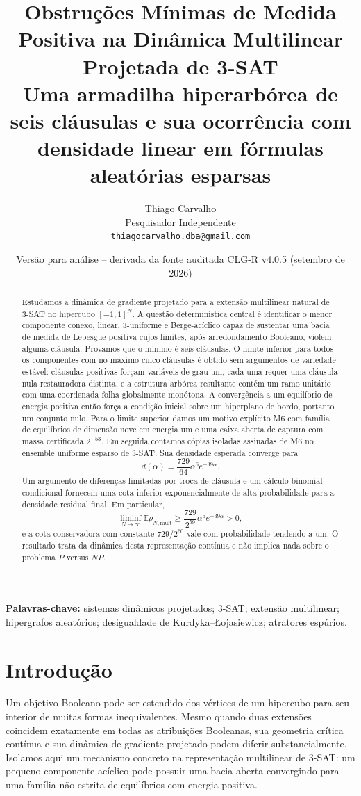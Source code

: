 \documentclass[11pt,a4paper]{article}
\title{Obstruções Mínimas de Medida Positiva na Dinâmica Multilinear Projetada de 3-SAT\\\large Uma armadilha hiperarbórea de seis cláusulas e sua ocorrência com densidade linear em fórmulas aleatórias esparsas}
\author{Thiago Carvalho\\Pesquisador Independente\\\texttt{thiagocarvalho.dba@gmail.com}}
\date{Versão para análise -- derivada da fonte auditada CLG-R v4.0.5 (setembro de 2026)}
\begin{document}
\maketitle
\begin{abstract}
Estudamos a dinâmica de gradiente projetado para a extensão multilinear natural de 3-SAT no hipercubo $[-1,1]^N$. A questão determinística central é identificar o menor componente conexo, linear, 3-uniforme e Berge-acíclico capaz de sustentar uma bacia de medida de Lebesgue positiva cujos limites, após arredondamento Booleano, violem alguma cláusula. Provamos que o mínimo é seis cláusulas. O limite inferior para todos os componentes com no máximo cinco cláusulas é obtido sem argumentos de variedade estável: cláusulas positivas forçam variáveis de grau um, cada uma requer uma cláusula nula restauradora distinta, e a estrutura arbórea resultante contém um ramo unitário com uma coordenada-folha globalmente monótona. A convergência a um equilíbrio de energia positiva então força a condição inicial sobre um hiperplano de bordo, portanto um conjunto nulo. Para o limite superior damos um motivo explícito M6 com família de equilíbrios de dimensão nove em energia um e uma caixa aberta de captura com massa certificada $2^{-53}$. Em seguida contamos cópias isoladas assinadas de M6 no ensemble uniforme esparso de 3-SAT. Sua densidade esperada converge para
\[
d(\alpha)=\frac{729}{64}\alpha^6e^{-39\alpha}.
\]
Um argumento de diferenças limitadas por troca de cláusula e um cálculo binomial condicional fornecem uma cota inferior exponencialmente de alta probabilidade para a densidade residual final. Em particular,
\[
\liminf_{N\to\infty}\mathbb E\rho_{N,\mathrm{mult}}\ge \frac{729}{2^{59}}\alpha^5e^{-39\alpha}>0,
\]
e a cota conservadora com constante $729/2^{60}$ vale com probabilidade tendendo a um. O resultado trata da dinâmica desta representação contínua e não implica nada sobre o problema $P$ versus $NP$.
\end{abstract}
\noindent\textbf{Palavras-chave:} sistemas dinâmicos projetados; 3-SAT; extensão multilinear; hipergrafos aleatórios; desigualdade de Kurdyka--\L{}ojasiewicz; atratores espúrios.

\section{Introdução}
Um objetivo Booleano pode ser estendido dos vértices de um hipercubo para seu interior de muitas formas inequivalentes. Mesmo quando duas extensões coincidem exatamente em todas as atribuições Booleanas, sua geometria crítica contínua e sua dinâmica de gradiente projetado podem diferir substancialmente. Isolamos aqui um mecanismo concreto na representação multilinear de 3-SAT: um pequeno componente acíclico pode possuir uma bacia aberta convergindo para uma família não estrita de equilíbrios com energia positiva.
\end{document}
